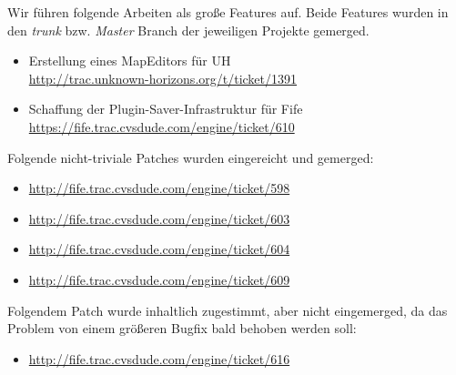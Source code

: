 Wir führen folgende Arbeiten als große Features auf. Beide Features
wurden in den {\it trunk} bzw. {\it Master} Branch der jeweiligen
Projekte gemerged.

\begin{itemize}
\item Erstellung eines MapEditors für UH \\
  \url{http://trac.unknown-horizons.org/t/ticket/1391}
  \item Schaffung der Plugin-Saver-Infrastruktur für Fife \\
  \url{https://fife.trac.cvsdude.com/engine/ticket/610}
\end{itemize}

Folgende nicht-triviale Patches wurden eingereicht und gemerged:
\begin{itemize}
  \item \url{http://fife.trac.cvsdude.com/engine/ticket/598}
  \item \url{http://fife.trac.cvsdude.com/engine/ticket/603}
  \item \url{http://fife.trac.cvsdude.com/engine/ticket/604}
  \item \url{http://fife.trac.cvsdude.com/engine/ticket/609}
\end{itemize}

Folgendem Patch wurde inhaltlich zugestimmt, aber nicht eingemerged, da das
Problem von einem größeren Bugfix bald behoben werden soll:
\begin{itemize}
  \item \url{http://fife.trac.cvsdude.com/engine/ticket/616}
\end{itemize}